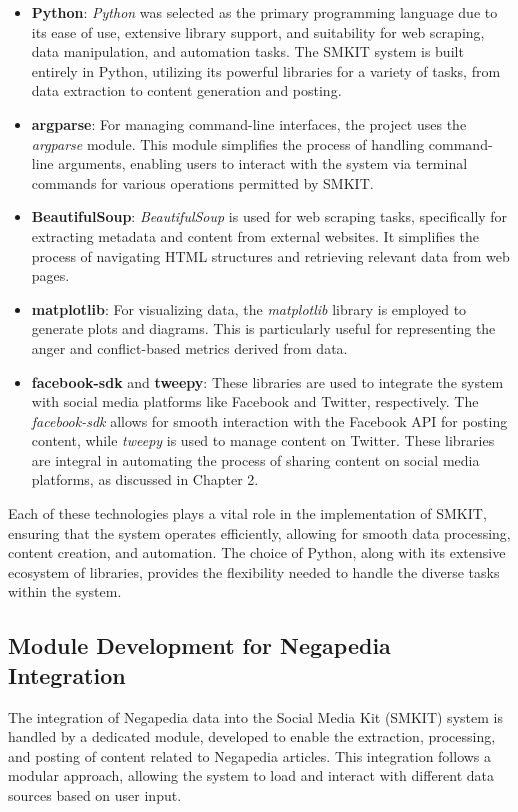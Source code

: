 \begin{itemize}
    \item \textbf{Python}: \textit{Python} was selected as the primary programming language due to its ease of use, extensive library support, and suitability for web scraping, data manipulation, and automation tasks. The SMKIT system is built entirely in Python, utilizing its powerful libraries for a variety of tasks, from data extraction to content generation and posting.
    
    \item \textbf{argparse}: For managing command-line interfaces, the project uses the \textit{argparse} module. This module simplifies the process of handling command-line arguments, enabling users to interact with the system via terminal commands for various operations permitted by SMKIT.

    \item \textbf{BeautifulSoup}: \textit{BeautifulSoup} is used for web scraping tasks, specifically for extracting metadata and content from external websites. It simplifies the process of navigating HTML structures and retrieving relevant data from web pages.

    \item \textbf{matplotlib}: For visualizing data, the \textit{matplotlib} library is employed to generate plots and diagrams. This is particularly useful for representing the anger and conflict-based metrics derived from data.
    
    \item \textbf{facebook-sdk} and \textbf{tweepy}: These libraries are used to integrate the system with social media platforms like Facebook and Twitter, respectively. The \textit{facebook-sdk} allows for smooth interaction with the Facebook API for posting content, while \textit{tweepy} is used to manage content on Twitter. These libraries are integral in automating the process of sharing content on social media platforms, as discussed in Chapter 2.

\end{itemize}

Each of these technologies plays a vital role in the implementation of SMKIT, ensuring that the system operates efficiently, allowing for smooth data processing, content creation, and automation. The choice of Python, along with its extensive ecosystem of libraries, provides the flexibility needed to handle the diverse tasks within the system.

\subsection{Module Development for Negapedia Integration}
\label{subsec:module_development_for_negapedia_integration}
The integration of Negapedia data into the Social Media Kit (SMKIT) system is handled by a dedicated module, developed to enable the extraction, processing, and posting of content related to Negapedia articles. This integration follows a modular approach, allowing the system to load and interact with different data sources based on user input.

